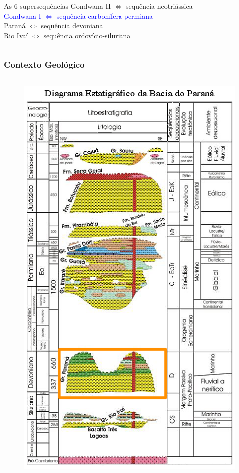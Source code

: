 \documentclass[10pt]{beamer} %
\begin{document}
\begin{frame}
\begin{columns}
\begin{column}{0.75\textwidth}
\begin{block}{As $6$ supersequências}
				Gondwana II $\Longleftrightarrow$ sequência neotriássica \\
				\textcolor{blue}{Gondwana I $\Longleftrightarrow$ sequência carbonífera-permiana}\\ 
				Paraná $\Longleftrightarrow$ sequência devoniana\\
				Rio Ivaí $\Longleftrightarrow$ sequência ordovício-siluriana\\
				\cite{Vail_1977,assine_1994,milani_orogenias_1998}
			\end{block}
		\end{column}
	\end{columns}
\end{frame}

\begin{frame}
	\frametitle{Contexto Geológico}
	\begin{columns}
		\begin{column}{0.4\textwidth}
			\begin{figure}
				\includegraphics[scale=0.36]{Imagens/diagramaparana.png}

\end{figure}
\end{column}
\end{columns}
\end{frame}
\end{document}
